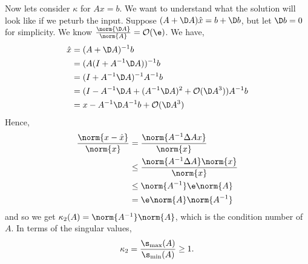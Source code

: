 \noindent
Now lets consider $\kappa$ for $Ax= b$. We want to understand what the solution will look like if we peturb the input. Suppose $(A + \D A)\hat x = b + \D b$, but let $\D b = 0$ for simplicity. We know $\frac{\norm{\D A}}{\norm{A}} = \mathcal{O}(\e)$. We have,
\begin{align*}
  \hat x &= (A + \D A)^{-1}b \\
  &= (A(I + A^{-1}\D A))^{-1}b \\
  &= (I + A^{-1}\D A)^{-1} A^{-1}b \\
  &= (I - A^{-1}\D A + (A^{-1}\D A)^2 + \mathcal{O}(\D A^3))A^{-1}b \\
  &= x - A^{-1}\D A^{-1} b + \mathcal{O}(\D A^3)
\end{align*}
Hence,
\begin{align*}
  \frac{\norm{x - \hat x}}{\norm{x}} &= \frac{\norm{A^{-1}\Delta A x}}{\norm{x}} \\
  &\le \frac{\norm{A^{-1}\Delta A} \norm{x}}{\norm{x}} \\
  &\le \norm{A^{-1}} \e \norm{A} \\
  &= \e \norm{A}\norm{A^{-1}}
\end{align*}
and so we get $\kappa_2(A) = \norm{A^{-1}}\norm{A}$, which is the condition number of $A$. In terms of the singular values,
$$ \kappa_2 = \frac{\s_{\rm{max}}(A)}{\s_{\rm{min}}(A)} \ge 1. $$